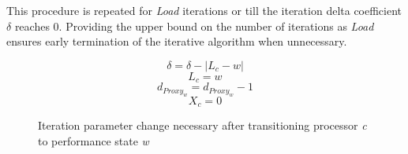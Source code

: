 This procedure is repeated for \textit{Load} iterations or till the iteration delta coefficient 
$\delta$ reaches 0. Providing the upper bound on the number of iterations as \textit{Load} 
ensures early termination of the iterative algorithm when unnecessary.


\begin{figure}[h!]
\centering
\begin{equation*}
    \delta = \delta - |L_{c} - w| 
\end{equation*}
\begin{equation*}
    L_{c} = w 
\end{equation*}
\begin{equation*}
    d_{Proxy_w} = d_{Proxy_w} - 1 
\end{equation*}
\begin{equation*}
    X_c = 0
\end{equation*}
\caption{Iteration parameter change necessary after transitioning processor \textit{c} to performance state \textit{w}}
\label{fig:adjust}
\end{figure}
